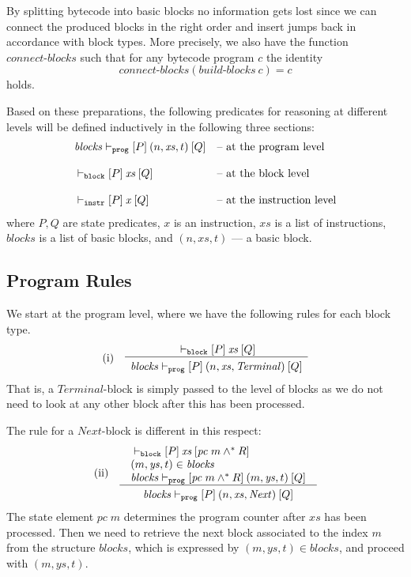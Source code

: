 \documentclass[sigplan,10pt]{acmart}\settopmatter{printfolios=true,printccs=false,printacmref=false}
\newcommand{\sconj}{\wedge^*}
\newcommand{\ttrip}[5]{\mathit{#1} \vdash_{\mathrm{#2}}[#3]\:#4\:[#5]}
\newcommand{\pc}{\mathit{pc}}
\newcommand{\RuleC}[2]{\begin{array}{c}#1\\\hline\noalign{\smallskip}#2\end{array}}
\newcommand{\bblocks}{\mathit{build\mbox{-}blocks}}
\newcommand{\cblocks}{\mathit{connect\mbox{-}blocks}}
\begin{document}
By splitting bytecode into basic blocks no information gets lost since we can connect the produced blocks
in the right order and insert jumps back in accordance with block types. More precisely, we also have the function
$\cblocks$ such that for any bytecode program $c$ the identity 
\[
\cblocks(\bblocks\:c) = c
\]
holds.  

Based on these preparations, the following predicates 
for reasoning at different levels
will be defined inductively in the following three sections:
\[
\begin{array}{l l}
\ttrip{\mathit{blocks}}{\mathtt{prog}}{P}{(n, \mathit{xs}, t)}{Q} & 
\mbox{-- at the program level}\\
\\
\ttrip{}{\mathtt{block}}{P}{\mathit{xs}}{Q} &
\mbox{-- at the block level}\\
\\
\ttrip{}{\mathtt{instr}}{P}{\mathit{x}}{Q} &
\mbox{-- at the instruction level}
\end{array}
\]
where $P, Q$ are state predicates, $x$ is an instruction, $\mathit{xs}$ is a list of instructions,
$\mathit{blocks}$ is a list of basic blocks, and
$(n, \mathit{xs}, t)$ --- a basic block.%
%
\subsection{Program Rules}
\label{sec:prog-rules}
%
We start at the program level, where we have the following rules for
each block type.
\[
\begin{array}{l l}
\mbox{(i)} & \RuleC{\ttrip{}{\mathtt{block}}{P}{\mathit{xs}}{Q}}
     {\ttrip{\mathit{blocks}}{\mathtt{prog}}{P}{(n, \mathit{xs}, \mathit{Terminal})}{Q}}
\end{array}
\]
That is, a $\mathit{Terminal}$-block is simply passed to the level of
blocks as we do not need to look at any other block after this has been processed.  

The rule for a $\mathit{Next}$-block is different in this respect:
\[
\begin{array}{l l}
\mbox{(ii)} & \RuleC{\begin{array}{l} \ttrip{}{\mathtt{block}}{P}{\mathit{xs}}{\pc\;m \sconj R} \\
                                      (m, \mathit{ys},t) \in \mathit{blocks} \\
                                       \ttrip{\mathit{blocks}}{\mathtt{prog}}{\pc\;m \sconj R}{(m, \mathit{ys},t)}{Q}
                     \end{array}}
     {\ttrip{\mathit{blocks}}{\mathtt{prog}}{P}{(n, \mathit{xs}, \mathit{Next})}{Q}}
\end{array}
\]
The state element $\pc\;m$ determines the program counter after $\mathit{xs}$ has been
processed. Then we need to retrieve the next block associated to the index $m$ from the structure $\mathit{blocks}$,
which is expressed by $(m, \mathit{ys},t) \in \mathit{blocks}$, and proceed with 
$(m, \mathit{ys},t)$.
\end{document}
